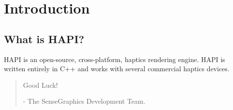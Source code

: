 
\chapter{Introduction}

\section{What is HAPI?}
HAPI is an open-source, cross-platform, haptics rendering engine. HAPI is
written entirely in C++ and works with several commercial haptics devices.


\begin{quotation}
Good Luck!

- The SenseGraphics Development Team.
\end{quotation}




 


